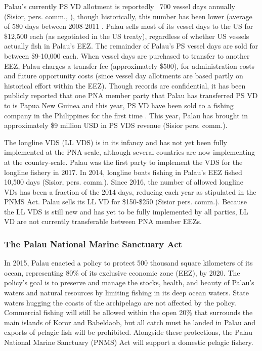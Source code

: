 \documentclass[11pt,english]{article}
\begin{document}
Palau’s currently PS VD allotment is reportedly ~700 vessel days annually (Sisior, pers. comm., \cite{Pojas2018}), though historically, this number has been lower (average of 580 days between 2008-2011 \citep{Tewid2013}. Palau sells most of its vessel days to the US for \$12,500 each (as negotiated in the US treaty), regardless of whether US vessels actually fish in Palau’s EEZ. The remainder of Palau’s PS vessel days are sold for between \$9-10,000 each. When vessel days are purchased to transfer to another EEZ, Palau charges a transfer fee (approximately \$500), for administration costs and future opportunity costs (since vessel day allotments are based partly on historical effort within the EEZ). Though records are confidential, it has been publicly reported that one PNA member party that Palau has transferred PS VD to is Papua New Guinea \citep{Tewid2013} and this year, PS VD have been sold to a fishing company in the Philippines for the first time \citep{Pojas2018}. This year, Palau has brought in approximately \$9 million USD in PS VDS revenue (Sisior pers. comm.). 

The longline VDS (LL VDS) is in its infancy and has not yet been fully implemented at the PNA-scale, although several countries are now implementing at the country-scale. Palau was the first party to implement the VDS for the longline fishery in 2017. In 2014, longline boats fishing in Palau’s EEZ fished 10,500 days (Sisior, pers. comm.). Since 2016, the number of allowed longline VDs has been a fraction of the 2014 days, reducing each year as stipulated in the PNMS Act. Palau sells its LL VD for \$150-\$250 (Sisior pers. comm.). Because the LL VDS is still new and has yet to be fully implemented by all parties, LL VD are not currently transferable between PNA member EEZs. 


\subsubsection{The Palau National Marine Sanctuary Act}

In 2015, Palau enacted a policy to protect 500 thousand square kilometers of its ocean, representing 80\% of its exclusive economic zone (EEZ), by 2020. The policy’s goal is to preserve and manage the stocks, health, and beauty of Palau’s waters and natural resources by limiting fishing in its deep ocean waters. State waters hugging the coasts of the archipelago are not affected by the policy. Commercial fishing will still be allowed within the open 20\% that surrounds the main islands of Koror and Babeldaob, but all catch must be landed in Palau and exports of pelagic fish will be prohibited. Alongside these protections, the Palau National Marine Sanctuary (PNMS) Act will support a domestic pelagic fishery.
\end{document}

